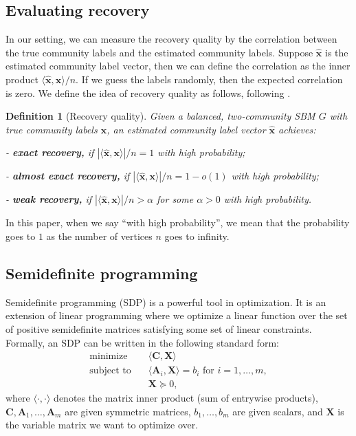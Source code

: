 \documentclass[11pt, titlepage]{article} %
\numberwithin{equation}{section}
\newtheorem{definition}{Definition}
\theoremstyle{definition}
\numberwithin{theorem}{section}
\numberwithin{lemma}{section}
\numberwithin{corollary}{section}
\numberwithin{proposition}{section}
\numberwithin{definition}{section}
\numberwithin{remark}{section}
\begin{document}
\subsection{Evaluating recovery}
In our setting, we can measure the recovery quality by the correlation between the true community 
labels and the estimated community labels. Suppose $\hat{\bm{x}}$ is the estimated community label 
vector, then we can define the correlation as the inner product
$\langle \hat{\bm{x}}, \bm{x} \rangle / n$. If we guess the labels randomly, then the expected 
correlation is zero. We define the idea of recovery quality as follows, following \cite{Abbe23}.
\begin{definition}[Recovery quality]
Given a balanced, two-community SBM $G$ with true community labels $\bm{x}$, an estimated community
label vector $\hat{\bm{x}}$ achieves:

- \textbf{exact recovery,} if $|\langle \hat{\bm{x}}, \bm{x} \rangle| / n = 1$ with high probability;

- \textbf{almost exact recovery,} if $|\langle \hat{\bm{x}}, \bm{x} \rangle| / n = 1 - o(1)$ 
with high probability;

- \textbf{weak recovery,} if $|\langle \hat{\bm{x}}, \bm{x} \rangle| / n > \alpha$ for some 
$\alpha > 0$ with high probability.
\end{definition}
In this paper, when we say ``with high probability'', we mean that the probability goes to $1$ as
the number of vertices $n$ goes to infinity.

\subsection{Semidefinite programming}
Semidefinite programming (SDP) is a powerful tool in optimization. It is an extension of linear
programming where we optimize a linear function over the set of positive semidefinite matrices 
satisfying some set of linear constraints. Formally, an SDP can be written in the following standard form:
\begin{align*}
\text{minimize}\quad &\langle \bm{C}, \bm{X} \rangle\\
\text{subject to}\quad &\langle \bm{A}_i, \bm{X} \rangle = b_i \text{ for } i = 1, \ldots, m,\\
&\bm{X} \succeq 0,
\end{align*}
where $\langle \cdot, \cdot \rangle$ denotes the matrix inner product (sum of entrywise products), 
$\bm{C}, \bm{A}_1, \ldots, \bm{A}_m$ are given symmetric matrices, $b_1, \ldots, b_m$ are given 
scalars, and $\bm{X}$ is the variable matrix we want to optimize over.
\end{document}
